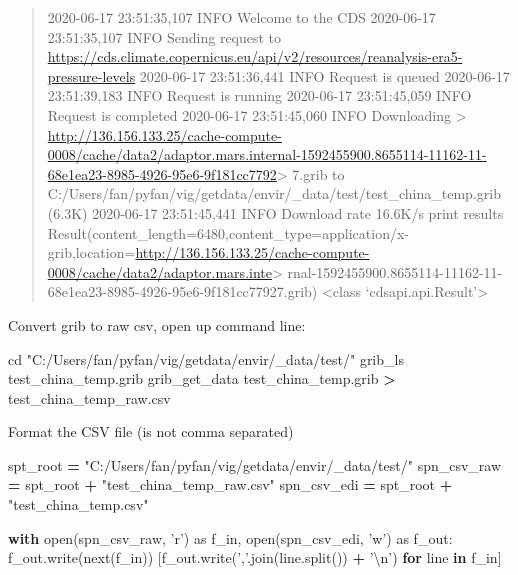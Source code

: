 \documentclass[
]{book}
\newenvironment{Shaded}{\begin{snugshade}}{\end{snugshade}}
\newcommand{\BuiltInTok}[1]{#1}
\newcommand{\CharTok}[1]{\textcolor[rgb]{0.31,0.60,0.02}{#1}}
\newcommand{\ControlFlowTok}[1]{\textcolor[rgb]{0.13,0.29,0.53}{\textbf{#1}}}
\newcommand{\ExtensionTok}[1]{#1}
\newcommand{\ImportTok}[1]{#1}
\newcommand{\KeywordTok}[1]{\textcolor[rgb]{0.13,0.29,0.53}{\textbf{#1}}}
\newcommand{\NormalTok}[1]{#1}
\newcommand{\OperatorTok}[1]{\textcolor[rgb]{0.81,0.36,0.00}{\textbf{#1}}}
\newcommand{\StringTok}[1]{\textcolor[rgb]{0.31,0.60,0.02}{#1}}
\begin{document}
\begin{quote}
2020-06-17 23:51:35,107 INFO Welcome to the CDS
2020-06-17 23:51:35,107 INFO Sending request to \url{https://cds.climate.copernicus.eu/api/v2/resources/reanalysis-era5-pressure-levels}
2020-06-17 23:51:36,441 INFO Request is queued
2020-06-17 23:51:39,183 INFO Request is running
2020-06-17 23:51:45,059 INFO Request is completed
2020-06-17 23:51:45,060 INFO Downloading \textgreater{} \url{http://136.156.133.25/cache-compute-0008/cache/data2/adaptor.mars.internal-1592455900.8655114-11162-11-68e1ea23-8985-4926-95e6-9f181cc7792}\textgreater{} 7.grib to C:/Users/fan/pyfan/vig/getdata/envir/\_data/test/test\_china\_temp.grib (6.3K)
2020-06-17 23:51:45,441 INFO Download rate 16.6K/s
print results
Result(content\_length=6480,content\_type=application/x-grib,location=\url{http://136.156.133.25/cache-compute-0008/cache/data2/adaptor.mars.inte}\textgreater{} rnal-1592455900.8655114-11162-11-68e1ea23-8985-4926-95e6-9f181cc77927.grib)
\textless class `cdsapi.api.Result'\textgreater{}
\end{quote}

Convert grib to raw csv, open up command line:

\begin{Shaded}
\begin{Highlighting}[]
\BuiltInTok{cd} \StringTok{"C:/Users/fan/pyfan/vig/getdata/envir/_data/test/"}
\ExtensionTok{grib_ls}\NormalTok{ test_china_temp.grib}
\ExtensionTok{grib_get_data}\NormalTok{ test_china_temp.grib }\OperatorTok{>}\NormalTok{ test_china_temp_raw.csv}
\end{Highlighting}
\end{Shaded}

Format the CSV file (is not comma separated)

\begin{Shaded}
\begin{Highlighting}[]
\NormalTok{spt_root }\OperatorTok{=} \StringTok{"C:/Users/fan/pyfan/vig/getdata/envir/_data/test/"}
\NormalTok{spn_csv_raw }\OperatorTok{=}\NormalTok{ spt_root }\OperatorTok{+} \StringTok{"test_china_temp_raw.csv"}
\NormalTok{spn_csv_edi }\OperatorTok{=}\NormalTok{ spt_root }\OperatorTok{+} \StringTok{"test_china_temp.csv"}

\ControlFlowTok{with} \BuiltInTok{open}\NormalTok{(spn_csv_raw, }\StringTok{'r'}\NormalTok{) }\ImportTok{as}\NormalTok{ f_in, }\BuiltInTok{open}\NormalTok{(spn_csv_edi, }\StringTok{'w'}\NormalTok{) }\ImportTok{as}\NormalTok{ f_out:}
\NormalTok{    f_out.write(}\BuiltInTok{next}\NormalTok{(f_in))}
\NormalTok{    [f_out.write(}\StringTok{','}\NormalTok{.join(line.split()) }\OperatorTok{+} \StringTok{'}\CharTok{\textbackslash{}n}\StringTok{'}\NormalTok{) }\ControlFlowTok{for}\NormalTok{ line }\KeywordTok{in}\NormalTok{ f_in]}
\end{Highlighting}
\end{Shaded}
\end{document}

